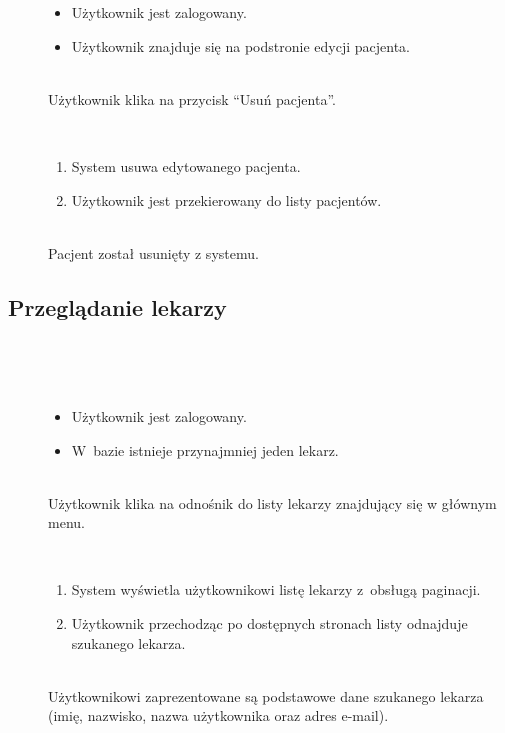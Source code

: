 \documentclass[11pt]{aghdpl}
\begin{document}
	\begin{description}
		\item[\useCaseAktor] \hfill \\
			\useCaseUzytkownik
		\item[\useCaseWarPocz] \hfill \\
			\begin{itemize}
				\item Użytkownik jest zalogowany.
				\item Użytkownik znajduje się na podstronie edycji pacjenta.
			\end{itemize}
		\item[\useCaseZdarzInicj] \hfill \\
			Użytkownik klika na przycisk ``Usuń pacjenta''.
		\item[\useCaseScenBaz] \hfill \\ 
			\begin{enumerate}
				\item System usuwa edytowanego pacjenta.
				\item Użytkownik jest przekierowany do listy pacjentów.
			\end{enumerate}
		\item[\useCaseWarKonc] \hfill \\ 
			Pacjent został usunięty z systemu.
	\end{description}

\subsection{Przeglądanie lekarzy}
	
	\begin{description}
		\item[\useCaseAktor] \hfill \\
			\useCaseUzytkownik
		\item[\useCaseWarPocz] \hfill \\
		\begin{itemize}
			\item Użytkownik jest zalogowany.
			\item W~bazie istnieje przynajmniej jeden lekarz.
		\end{itemize}
			
		\item[\useCaseZdarzInicj] \hfill \\
			Użytkownik klika na odnośnik do listy lekarzy znajdujący się w głównym menu.
		\item[\useCaseScenBaz] \hfill \\ 
			\begin{enumerate}
			\item System wyświetla użytkownikowi listę lekarzy z~obsługą paginacji.
			\item Użytkownik przechodząc po dostępnych stronach listy odnajduje szukanego lekarza.
			\end{enumerate}
		\item[\useCaseWarKonc] \hfill \\ 
			Użytkownikowi zaprezentowane są podstawowe dane szukanego lekarza (imię, nazwisko, nazwa użytkownika oraz adres e-mail).
	\end{description}
\end{document}
